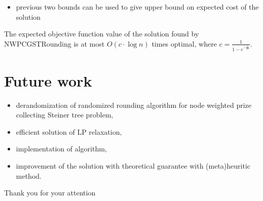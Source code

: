 \documentclass{beamer}
\begin{document}
\begin{frame}{\insertsection}{\insertsubsection}
    \begin{itemize}
        \item previous two bounds can be used to give upper bound on expected cost of the solution
    \end{itemize}
    \begin{theorem}
        The expected objective function value of the solution found by \textrm{NWPCGSTRounding} is at most $O(c\cdot\log{n})$ times optimal, where $c=\frac{1}{1-e^{-\frac{1}{2\gamma}}}$.

    \end{theorem}

\end{frame}


\section{Future work}

\begin{frame}{\insertsection}{\insertsubsection}
    \begin{itemize}
        \item derandomization of randomized rounding algorithm for node weighted prize collecting Steiner tree problem,
        \item efficient solution of LP relaxation,
        \item implementation of algorithm,
        \item improvement of the solution with theoretical guarantee with (meta)heuritic method.
    \end{itemize}
   

\end{frame}

\begin{frame}
    \begin{center}
        {\huge Thank you for your attention}
    \end{center}
\end{frame}
\end{document}
